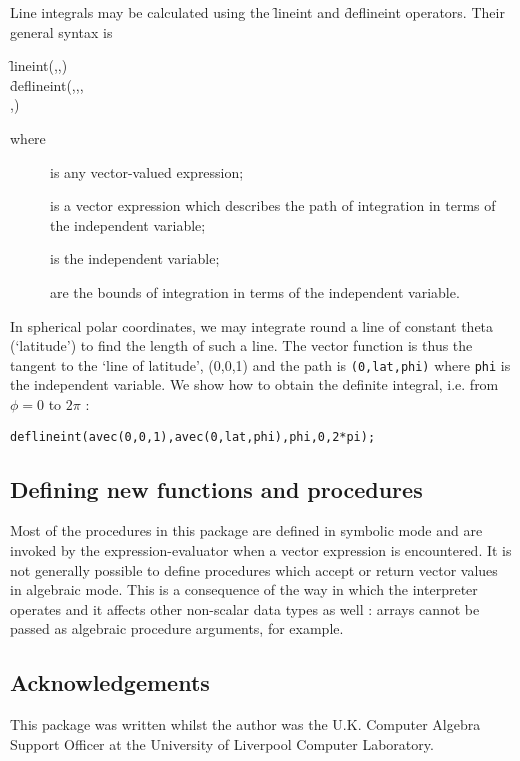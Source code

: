  
\hypertarget{operator:LINEINT}{}\hypertarget{operator:DEFLINEINT}{}
 
Line integrals may be calculated using the \f{lineint} and \f{deflineint}
operators. Their general syntax is
\begin{syntax}
  \f{lineint}(,,) \\
  \f{deflineint}(,,,\\
  ,)  
\end{syntax}
where
\begin{description}
\item[] is any vector-valued expression;
\item[] is a vector expression which describes the path of
integration in terms of the independent variable;
\item[] is the independent variable;
\item[]
\item[] are the bounds of integration in terms of the
independent variable.
\end{description}

\example{}

In spherical polar coordinates, we may integrate round a line of
constant theta (`latitude') to find the length of such a line. The
vector function is thus the tangent to the `line of latitude', (0,0,1)
and the path is \texttt{(0,lat,phi)} where \texttt{phi} is the independent
variable. We show how to obtain the definite integral, i.e. from
$\phi=0$ to $2 \pi$ :
\begin{verbatim}
deflineint(avec(0,0,1),avec(0,lat,phi),phi,0,2*pi);
\end{verbatim}

\subsection{Defining new functions and procedures}

Most of the procedures in this package are defined in symbolic mode
and are invoked by the \REDUCE expression-evaluator when a vector
expression is encountered. It is not generally possible to define
procedures which accept or return vector values in algebraic mode.
This is a consequence of the way in which the \REDUCE interpreter
operates and it affects other non-scalar data types as well : arrays
cannot be passed as algebraic procedure arguments, for example.

\subsection{Acknowledgements}

This package was written whilst the author was the U.K. Computer
Algebra Support Officer at the University of Liverpool Computer Laboratory.

